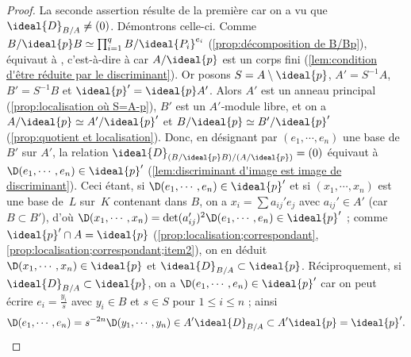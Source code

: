 \documentclass[11pt, %
  title in boldface,
  theorem in new line,
  theorem numbering = section,
  number theorems separately,
  simple name,
]{beaulivre}
\begin{document}
    \begin{proof}
        La seconde assertion résulte de la première car on a vu que \( \ideal{D}_{B/A} \neq (0) \). Démontrons celle-ci. Comme \( B/\ideal{p}B \simeq \prod_{i=1}^q B/\ideal{P_i}^{e_i} \) (\cref{prop:décomposition de B/Bp}),  équivaut à , c'est-à-dire à  car \( A/\ideal{p} \) est un corps fini (\cref{lem:condition d'être réduite par le discriminant}). Or posons \( S = A \setminus \ideal{p} \), \( A' = S^{-1} A \), \( B' = S^{-1} B \) et \( \ideal{p}' = \ideal{p} A' \). Alors \( A' \) est un anneau principal (\cref{prop:localisation où S=A-p}), \( B' \) est un \( A' \)‑module libre, et on a \( A/\ideal{p} \simeq A'/\ideal{p}' \) et \( B/\ideal{p} \simeq B'/\ideal{p}' \) (\cref{prop:quotient et localisation}). Donc, en désignant par \( (e_1, \cdots, e_n) \) une base de \( B' \) sur \( A' \), la relation \( \ideal{D}_{(B/\ideal{p}B)/(A/\ideal{p})} = (0) \) équivaut à \( \D(e_1, \cdots, e_n) \in \ideal{p}' \) (\cref{lem:discriminant d'image est image de discriminant}). Ceci étant, si \( \D(e_1, \cdots, e_n) \in \ideal{p}' \) et si \( (x_1, \cdots, x_n) \) est une base de~\( L \) sur~\( K \) contenant dans \( B \), on a \( x_i = \sum a_{ij}' e_j \) avec \( a_{ij}' \in A' \) (car \( B \subset B' \)), d'où \( \D(x_1, \cdots, x_n) = \det(a_{ij}')^2 \D(e_1, \cdots, e_n) \in \ideal{p}' \) ; comme \( \ideal{p}' \cap A = \ideal{p} \) (\cref{prop:localisation;correspondant}, \ref{prop:localisation;correspondant;item2}), on en déduit \( \D(x_1, \cdots, x_n) \in \ideal{p} \) et \( \ideal{D}_{B/A} \subset \ideal{p} \). Réciproquement, si \( \ideal{D}_{B/A} \subset \ideal{p} \), on a \( \D(e_1, \cdots, e_n) \in \ideal{p}' \) car on peut écrire \( e_i = \frac{y_i}{s} \) avec \( y_i \in B \) et \( s \in S \) pour \( 1 \leqslant i \leqslant n \) ; ainsi
        \[
            \D(e_1, \cdots, e_n) = s^{-2n} \D(y_1, \cdots, y_n) \in A' \ideal{D}_{B/A} \subset A'\ideal{p} = \ideal{p}'.
            \qedhere
        \]
    \end{proof}
\end{document}
